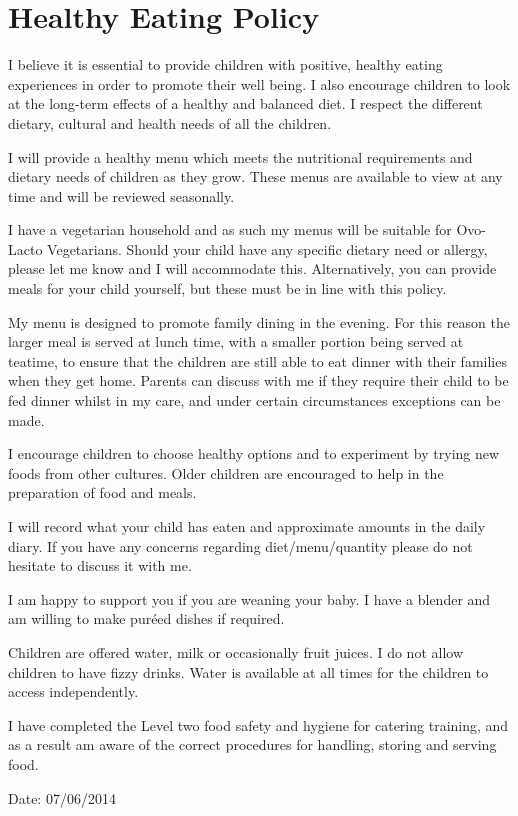 

\section{Healthy Eating Policy}

I believe it is essential to provide children with positive, healthy
eating experiences in order to promote their well being. I also
encourage children to look at the long-term effects of a healthy and
balanced diet. I respect the different dietary, cultural and health
needs of all the children.

I will provide a healthy menu which meets the nutritional requirements
and dietary needs of children as they grow. These menus are available to
view at any time and will be reviewed seasonally.

I have a vegetarian household and as such my menus will be suitable for
Ovo-Lacto Vegetarians. Should your child have any specific dietary need
or allergy, please let me know and I will accommodate this.
Alternatively, you can provide meals for your child yourself, but these
must be in line with this policy.

My menu is designed to promote family dining in the evening. For this
reason the larger meal is served at lunch time, with a smaller portion
being served at teatime, to ensure that the children are still able to
eat dinner with their families when they get home. Parents can discuss
with me if they require their child to be fed dinner whilst in my care,
and under certain circumstances exceptions can be made.

I encourage children to choose healthy options and to experiment by
trying new foods from other cultures. Older children are encouraged to
help in the preparation of food and meals.

I will record what your child has eaten and approximate amounts in the
daily diary. If you have any concerns regarding diet/menu/quantity
please do not hesitate to discuss it with me.

I am happy to support you if you are weaning your baby. I have a blender
and am willing to make puréed dishes if required.

Children are offered water, milk or occasionally fruit juices. I do not
allow children to have fizzy drinks. Water is available at all times for
the children to access independently.

I have completed the Level two food safety and hygiene for catering
training, and as a result am aware of the correct procedures for
handling, storing and serving food.

Date: 07/06/2014


